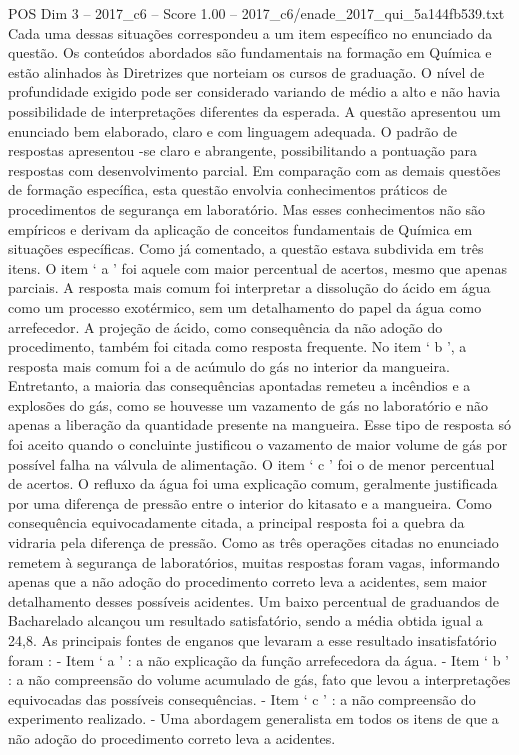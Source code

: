 \begin{textsample}{POS Dim 3 – 2017\_c6 – Score 1.00 – 2017\_c6/enade\_2017\_qui\_5a144fb539.txt}
Cada uma dessas situações correspondeu a um item específico no enunciado da questão.
Os conteúdos abordados são fundamentais na formação em Química e estão alinhados às Diretrizes que norteiam os cursos de graduação.
O nível de profundidade exigido pode ser considerado variando de médio a alto e não havia possibilidade de interpretações diferentes da esperada.
A questão apresentou um enunciado bem elaborado, claro e com linguagem adequada.
O padrão de respostas apresentou -se claro e abrangente, possibilitando a pontuação para respostas com desenvolvimento parcial.
Em comparação com as demais questões de formação específica, esta questão envolvia conhecimentos práticos de procedimentos de segurança em laboratório.
Mas esses conhecimentos não são empíricos e derivam da aplicação de conceitos fundamentais de Química em situações específicas.
Como já comentado, a questão estava subdivida em três itens.
O item ‘ a ’ foi aquele com maior percentual de acertos, mesmo que apenas parciais.
A resposta mais comum foi interpretar a dissolução do ácido em água como um processo exotérmico, sem um detalhamento do papel da água como arrefecedor.
A projeção de ácido, como consequência da não adoção do procedimento, também foi citada como resposta frequente.
No item ‘ b ’, a resposta mais comum foi a de acúmulo do gás no interior da mangueira.
Entretanto, a maioria das consequências apontadas remeteu a incêndios e a explosões do gás, como se houvesse um vazamento de gás no laboratório e não apenas a liberação da quantidade presente na mangueira.
Esse tipo de resposta só foi aceito quando o concluinte justificou o vazamento de maior volume de gás por possível falha na válvula de alimentação.
O item ‘ c ’ foi o de menor percentual de acertos.
O refluxo da água foi uma explicação comum, geralmente justificada por uma diferença de pressão entre o interior do kitasato e a mangueira.
Como consequência equivocadamente citada, a principal resposta foi a quebra da vidraria pela diferença de pressão.
Como as três operações citadas no enunciado remetem à segurança de laboratórios, muitas respostas foram vagas, informando apenas que a não adoção do procedimento correto leva a acidentes, sem maior detalhamento desses possíveis acidentes.
Um baixo percentual de graduandos de Bacharelado alcançou um resultado satisfatório, sendo a média obtida igual a 24,8.
As principais fontes de enganos que levaram a esse resultado insatisfatório foram : - Item ‘ a ’ : a não explicação da função arrefecedora da água. - Item ‘ b ’ : a não compreensão do volume acumulado de gás, fato que levou a interpretações equivocadas das possíveis consequências. - Item ‘ c ’ : a não compreensão do experimento realizado. - Uma abordagem generalista em todos os itens de que a não adoção do procedimento correto leva a acidentes.

\end{textsample}
